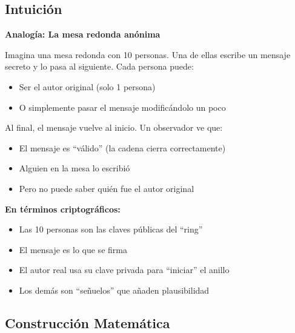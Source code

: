 \documentclass[11pt,a4paper,twoside]{book}
\begin{document}
\subsection{Intuici\'on}

\begin{intuicion}
\textbf{Analog\'ia: La mesa redonda an\'onima}

Imagina una mesa redonda con 10 personas. Una de ellas escribe un mensaje secreto y lo pasa al siguiente. Cada persona puede:
\begin{itemize}
    \item Ser el autor original (solo 1 persona)
    \item O simplemente pasar el mensaje modific\'andolo un poco
\end{itemize}

Al final, el mensaje vuelve al inicio. Un observador ve que:
\begin{itemize}
    \item El mensaje es ``v\'alido'' (la cadena cierra correctamente)
    \item Alguien en la mesa lo escribi\'o
    \item Pero no puede saber qui\'en fue el autor original
\end{itemize}

\textbf{En t\'erminos criptogr\'aficos:}
\begin{itemize}
    \item Las 10 personas son las claves p\'ublicas del ``ring''
    \item El mensaje es lo que se firma
    \item El autor real usa su clave privada para ``iniciar'' el anillo
    \item Los dem\'as son ``se\~nuelos'' que a\~naden plausibilidad
\end{itemize}
\end{intuicion}

\subsection{Construcci\'on Matem\'atica}
\end{document}
